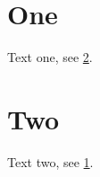 \documentclass{article}
\begin{document}
\section{One}\label{../esc}
Text one, see \ref{a/../b}.
\section{Two}\label{a/../b}
Text two, see \ref{../esc}.
\end{document}
